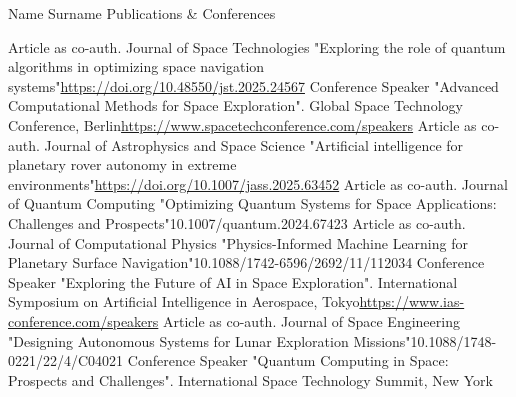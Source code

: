 \documentclass{template}
\begin{document}

{Name Surname}
{Publications \& Conferences}

\NewPart{}{}

{Article as co-auth. Journal of Space Technologies}
{"Exploring the role of quantum algorithms in optimizing space navigation systems"}{\href{https://doi.org/10.48550/jst.2025.24567}{https://doi.org/10.48550/jst.2025.24567}}
{Conference Speaker}
{"Advanced Computational Methods for Space Exploration". Global Space Technology Conference, Berlin}{\href{https://www.spacetechconference.com/speakers}{https://www.spacetechconference.com/speakers}}
{Article as co-auth. Journal of Astrophysics and Space Science}
{"Artificial intelligence for planetary rover autonomy in extreme environments"}{\href{https://doi.org/10.1007/jass.2025.63452}{https://doi.org/10.1007/jass.2025.63452}}
{Article as co-auth. Journal of Quantum Computing}
{"Optimizing Quantum Systems for Space Applications: Challenges and Prospects"}{10.1007/quantum.2024.67423}
{Article as co-auth. Journal of Computational Physics}
{"Physics-Informed Machine Learning for Planetary Surface Navigation"}{10.1088/1742-6596/2692/11/112034}
{Conference Speaker}
{"Exploring the Future of AI in Space Exploration". International Symposium on Artificial Intelligence in Aerospace, Tokyo}{\href{https://www.ias-conference.com/speakers}{https://www.ias-conference.com/speakers}}
{Article as co-auth. Journal of Space Engineering}
{"Designing Autonomous Systems for Lunar Exploration Missions"}{10.1088/1748-0221/22/4/C04021}
{Conference Speaker}
{"Quantum Computing in Space: Prospects and Challenges". International Space Technology Summit, New York}{}
 
\end{document}
